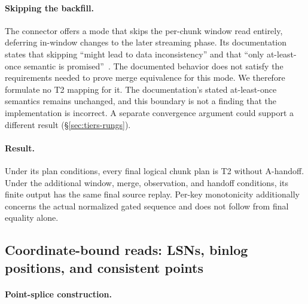 \documentclass[sigconf,nonacm,10pt]{acmart}
\theoremstyle{plain}
\theoremstyle{definition}
\begin{document}
\paragraph{Skipping the backfill.}
The connector offers a mode that skips the per-chunk window read
entirely, deferring in-window changes to the later streaming
phase. Its documentation states that skipping ``might lead to data
inconsistency'' and that ``only at-least-once semantic is
promised''~\cite{flinkcdc_mysql}. The documented behavior does not
satisfy the requirements needed to prove merge equivalence
for this mode. We therefore formulate no T2 mapping for it. The
documentation's stated at-least-once semantics remains unchanged, and
this boundary is not a finding that the implementation is incorrect.
A separate convergence argument could support a different result
(\S\ref{sec:tiers-rungs}).

\paragraph{Result.}
Under its plan conditions, every final logical chunk plan is T2 without
A-handoff. Under the additional window, merge, observation, and handoff
conditions, its finite output has the same final source replay.
Per-key monotonicity additionally concerns the actual normalized gated
sequence and does not follow from final equality alone.

\subsection{Coordinate-bound reads: LSNs, binlog positions,
and consistent points}\label{sec:inst-splice}

\paragraph{Point-splice construction.}
\end{document}
